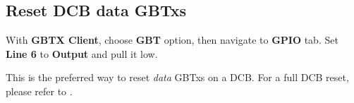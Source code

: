 \subsection{Reset DCB data GBTxs}
With \textbf{GBTX Client}, choose \textbf{GBT} option, then navigate to
\textbf{GPIO} tab.
Set \textbf{Line 6} to \textbf{Output} and pull it low.

\begin{leftbar}
    This is the preferred way to reset \emph{data} GBTxs on a DCB. For a full
    DCB reset, please refer to .
\end{leftbar}
